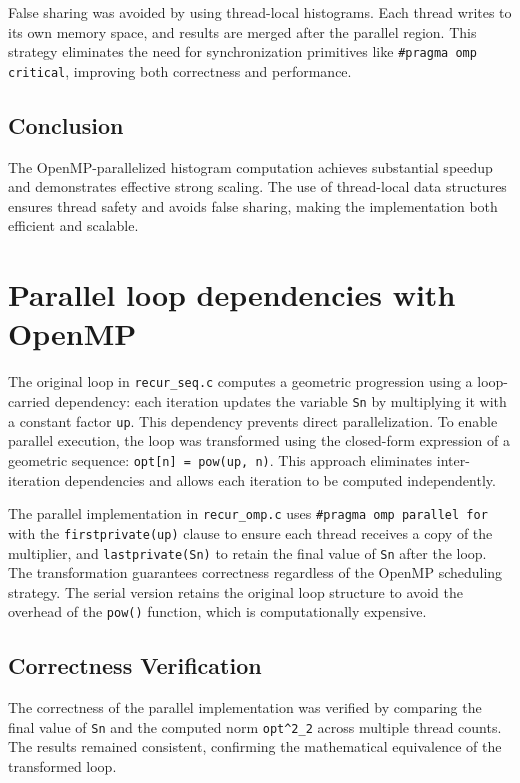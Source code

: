 \documentclass[unicode,11pt,a4paper,oneside,numbers=endperiod,openany]{scrartcl}
\begin{document}
False sharing was avoided by using thread-local histograms. Each thread writes to its own memory space, and results are merged after the parallel region. This strategy eliminates the need for synchronization primitives like \texttt{\#pragma omp critical}, improving both correctness and performance.

\subsection{Conclusion}
The OpenMP-parallelized histogram computation achieves substantial speedup and demonstrates effective strong scaling. The use of thread-local data structures ensures thread safety and avoids false sharing, making the implementation both efficient and scalable.


\newpage
\section{Parallel loop dependencies with OpenMP }

The original loop in \texttt{recur\_seq.c} computes a geometric progression using a loop-carried dependency: each iteration updates the variable \texttt{Sn} by multiplying it with a constant factor \texttt{up}. This dependency prevents direct parallelization. To enable parallel execution, the loop was transformed using the closed-form expression of a geometric sequence: \texttt{opt[n] = pow(up, n)}. This approach eliminates inter-iteration dependencies and allows each iteration to be computed independently.

The parallel implementation in \texttt{recur\_omp.c} uses \texttt{\#pragma omp parallel for} with the \texttt{firstprivate(up)} clause to ensure each thread receives a copy of the multiplier, and \texttt{lastprivate(Sn)} to retain the final value of \texttt{Sn} after the loop. The transformation guarantees correctness regardless of the OpenMP scheduling strategy. The serial version retains the original loop structure to avoid the overhead of the \texttt{pow()} function, which is computationally expensive.

\subsection{Correctness Verification}

The correctness of the parallel implementation was verified by comparing the final value of \texttt{Sn} and the computed norm \texttt{opt\textasciicircum2\_2} across multiple thread counts. The results remained consistent, confirming the mathematical equivalence of the transformed loop.
\end{document}
